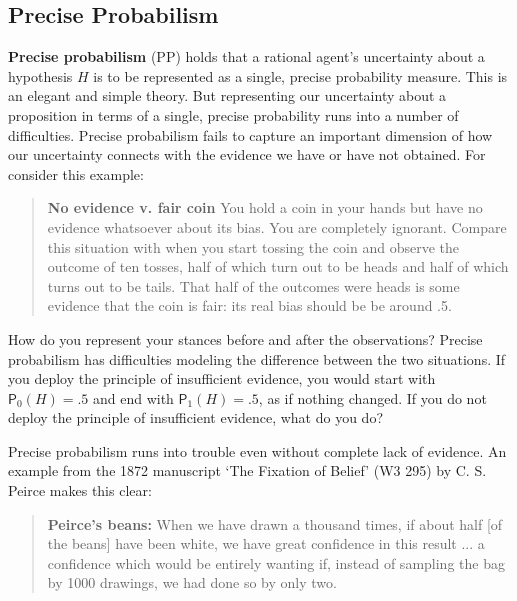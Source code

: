 \documentclass[
  10pt,
  dvipsnames,enabledeprecatedfontcommands]{scrartcl}
\begin{document}
\hypertarget{precise-probabilism}{%
\subsection{Precise Probabilism}\label{precise-probabilism}}

\textbf{Precise probabilism} (\textsf{PP}) holds that a rational agent's
uncertainty about a hypothesis \(H\) is to be represented as a single,
precise probability measure. This is an elegant and simple theory. But
representing our uncertainty about a proposition in terms of a single,
precise probability runs into a number of difficulties. Precise
probabilism fails to capture an important dimension of how our
uncertainty connects with the evidence we have or have not obtained. For
consider this example:

\begin{quote}
\textbf{No evidence v. fair coin}
You hold a coin in your hands but have no evidence 
whatsoever about its bias. You are completely ignorant. Compare this situation with when 
you start tossing the coin and observe the outcome of ten tosses, 
half of which turn out to be heads and half of which turns out to be tails. 
That half of the outcomes were heads is some evidence that the coin is fair: its 
real bias should be be around .5.
\end{quote}

\noindent How do you represent your stances before and after the
observations? Precise probabilism has difficulties modeling the
difference between the two situations. If you deploy the principle of
insufficient evidence, you would start with \(\mathsf{P}_0(H)=.5\) and
end with \(\mathsf{P}_1(H)=.5\), as if nothing changed. If you do not
deploy the principle of insufficient evidence, what do you do?

Precise probabilism runs into trouble even without complete lack of
evidence. An example from the 1872 manuscript `The Fixation of Belief'
(W3 295) by C. S. Peirce makes this clear:

\begin{quote} \textbf{Peirce's beans:} When we have drawn a thousand times, if about half [of the beans] have been white, we have great confidence in this result  ... a confidence which would be entirely wanting if, instead of sampling the bag by 1000 drawings, we had done so by only two.
\end{quote}
\end{document}
